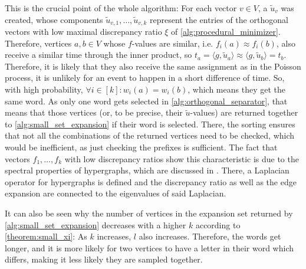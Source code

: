  
This is the crucial point of the whole algorithm: For each vector $v\in V$, a $\tilde{u}_v$ was created, whose components $\tilde{u}_{v,1} , \ldots, \tilde{u}_{v,k}$ represent the entries of the orthogonal vectors with low maximal discrepancy ratio $\xi$ of \cref{alg:procedural_minimizer}. Therefore, vertices $a,b\in V$ whose $f$-values are similar, i.e. $f_i(a)\approx f_i(b)$, also receive a similar time through the inner product, so $ t_a = \langle g, \tilde{u}_a \rangle \approx  \langle g, \tilde{u}_b \rangle =t_b $. Therefore, it is likely that they also receive the same assignment as in the Poisson process, it is unlikely for an event to happen in a short difference of time. So, with high probability, $\forall i\in [k]: w_i(a) = w_i(b)$, which means they get the same word. As only one word gets selected in \cref{alg:orthogonal_separator}, that means that those vertices (or, to be precise, their $\tilde{u}$-values) are returned together to \cref{alg:small_set_expansion} if their word is selected. There, the sorting ensures that not all the combinations of the returned vertices need to be checked, which would be inefficient, as just checking the prefixes is sufficient. The fact that vectors $f_1, \ldots, f_k$ with low discrepancy ratios show this characteristic is due to the spectral properties of hypergraphs, which are discussed in \cite{ChanLTZ16}. There, a Laplacian  operator for hypergraphs is defined and the discrepancy ratio as well as the edge expansion are connected to the eigenvalues of said Laplacian.

It can also be seen why the number of vertices in the expansion set returned by \cref{alg:small_set_expansion} decreases with a higher $k$ according to \cref{theorem:small_xi}: As $k$ increases, $l$ also increases. Therefore, the words get longer, and it is more likely for two vertices to have a letter in their word which differs, making it less likely they are sampled together.
	










